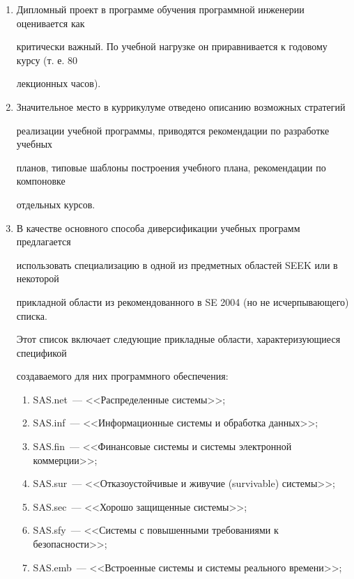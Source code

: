 \begin{enumerate}[1.]
желаемой (D) либо факультативной (O) по отношению к основному набору знаний по 

программной инженерии. 

\item Дипломный проект в программе обучения программной инженерии оценивается как 

критически важный. По учебной нагрузке он приравнивается к годовому курсу (т. е. 80 

лекционных часов). 

\item Значительное место в куррикулуме отведено описанию возможных стратегий 

реализации учебной программы, приводятся рекомендации по разработке учебных 

планов, типовые шаблоны построения учебного плана, рекомендации по компоновке 

отдельных курсов. 

\item В качестве основного способа диверсификации учебных программ предлагается 

использовать специализацию в одной из предметных областей SEEK или в некоторой 

прикладной области из рекомендованного в SE 2004 (но не исчерпывающего) списка. 

Этот список включает следующие прикладные области, характеризующиеся спецификой 

создаваемого для них программного обеспечения:

\begin{enumerate}[(1)]

\item SAS.net~--- <<Распределенные системы>>;

\item SAS.inf~--- <<Информационные системы и обработка данных>>;

\item SAS.fin~--- <<Финансовые системы и системы электронной коммерции>>;

\item SAS.sur~--- <<Отказоустойчивые и живучие (survivable) системы>>;

\item SAS.sec~--- <<Хорошо защищенные системы>>;

\item SAS.sfy~--- <<Системы с повышенными требованиями к безопасности>>;

\item SAS.emb~--- <<Встроенные системы и системы реального времени>>;


\end{enumerate}
\end{enumerate}
